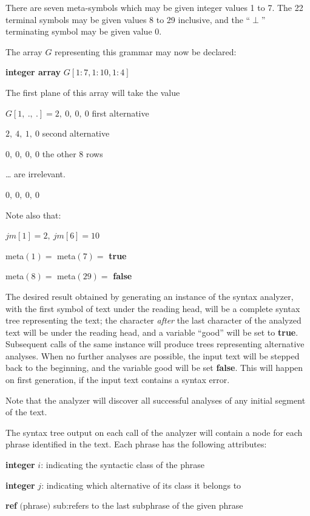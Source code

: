 \documentclass[twoside,11pt]{book}
\begin{document}
\noindent
There are seven meta-symbols which may be given integer values 1 to 7. The 22 terminal symbols may be given values 8 to 29 inclusive, and the ``$\perp$'' terminating symbol may be given value 0.

The array $G$ representing this grammar may now be declared:

\quad \textbf{integer array} $G[1:7, 1:10, 1:4]$

\noindent
The first plane of this array will take the value

\quad $G[1,\ .,\ .] = 2,\ 0,\ 0,\ 0$\tabto*{12em} first alternative

\tabto*{7.4em}$2,\ 4,\ 1,\ 0$\tabto*{12em} second alternative

\tabto*{7.4em}$0,\ 0,\ 0,\ 0$\tabto*{12em} the other 8 rows

\tabto*{7.4em}\quad\dots\tabto*{12em} are irrelevant.

\tabto*{7.4em}$0,\ 0,\ 0,\ 0$

\noindent
Note also that:

\quad $jm[1] = 2,\ jm[6] = 10$

\quad meta$(1) =$ meta$(7) =$ \textbf{true}

\quad meta$(8) =$ meta$(29) =$ \textbf{false}

The desired result obtained by generating an instance of the syntax analyzer, with the first symbol of text under the reading head, will be a complete syntax tree representing the text; the character \textit{after} the last character of the analyzed text will be under the reading head, and a variable ``good'' will be set to \textbf{true}. Subsequent calls of the same instance will produce trees representing alternative analyses. When no further analyses are possible, the input text will be stepped back to the beginning, and the variable good will be set \textbf{false}. This will happen on first generation, if the input text contains a syntax error.

Note that the analyzer will discover all successful analyses of any initial segment of the text.

The syntax tree output on each call of the analyzer will contain a node for each phrase identified in the text. Each phrase has the following attributes:

\quad \textbf{integer} $i$: indicating the syntactic class of the phrase

\quad \textbf{integer} $j$: indicating which alternative of its class it belongs to

\quad \textbf{ref} $($phrase$)$ sub:refers to the last subphrase of the given phrase
\end{document}
